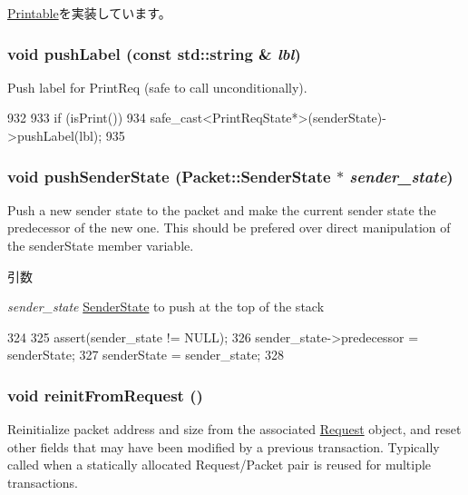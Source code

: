 \hyperlink{classPrintable_a3be2c5a60e9670becc3259fc689833c5}{Printable}を実装しています。\hypertarget{classPacket_ad2656c333949d4b445823d47398829f2}{
\subsubsection[{pushLabel}]{\setlength{\rightskip}{0pt plus 5cm}void pushLabel (const std::string \& {\em lbl})}}
\label{classPacket_ad2656c333949d4b445823d47398829f2}
Push label for PrintReq (safe to call unconditionally). 


\begin{DoxyCode}
932     {
933         if (isPrint())
934             safe_cast<PrintReqState*>(senderState)->pushLabel(lbl);
935     }
\end{DoxyCode}
\hypertarget{classPacket_a6a6aa11d6c2aec2df5aafeefe2847d8e}{
\subsubsection[{pushSenderState}]{\setlength{\rightskip}{0pt plus 5cm}void pushSenderState ({\bf Packet::SenderState} $\ast$ {\em sender\_\-state})}}
\label{classPacket_a6a6aa11d6c2aec2df5aafeefe2847d8e}
Push a new sender state to the packet and make the current sender state the predecessor of the new one. This should be prefered over direct manipulation of the senderState member variable.


\begin{DoxyParams}{引数}
\item[{\em sender\_\-state}]\hyperlink{structPacket_1_1SenderState}{SenderState} to push at the top of the stack \end{DoxyParams}



\begin{DoxyCode}
324 {
325     assert(sender_state != NULL);
326     sender_state->predecessor = senderState;
327     senderState = sender_state;
328 }
\end{DoxyCode}
\hypertarget{classPacket_a03e8085580e8f97f3177195fe2ed27e7}{
\subsubsection[{reinitFromRequest}]{\setlength{\rightskip}{0pt plus 5cm}void reinitFromRequest ()}}
\label{classPacket_a03e8085580e8f97f3177195fe2ed27e7}
Reinitialize packet address and size from the associated \hyperlink{classRequest}{Request} object, and reset other fields that may have been modified by a previous transaction. Typically called when a statically allocated Request/Packet pair is reused for multiple transactions. 


